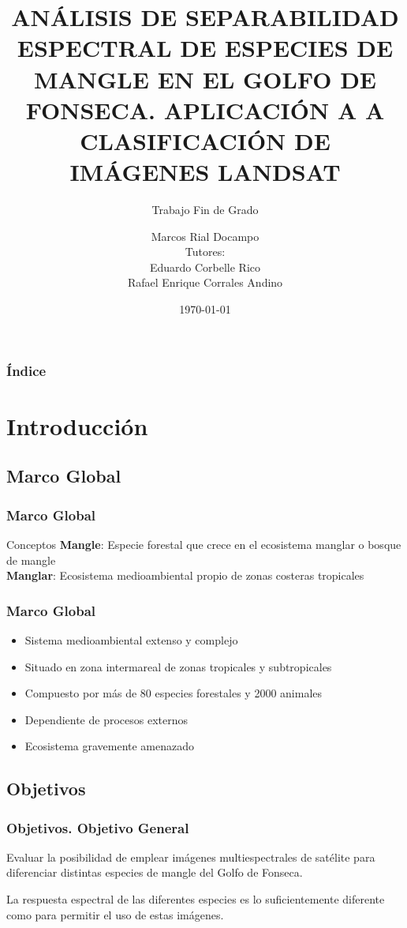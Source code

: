 \documentclass[12pt]{beamer}
\author[Marcos Rial Docampo]{Marcos Rial Docampo\\
\footnotesize{Tutores:\\
Eduardo Corbelle Rico\\
Rafael Enrique Corrales Andino}}
\title[Análisis de Separabilidad Espectral]{ANÁLISIS DE SEPARABILIDAD ESPECTRAL DE ESPECIES DE MANGLE EN EL GOLFO DE FONSECA. APLICACIÓN A A CLASIFICACIÓN DE IMÁGENES LANDSAT}
\subtitle{Trabajo Fin de Grado}
\institute[USC-EPS]{Universidad de Santiago de Compostela\\Escuela Politécnica Superior de Lugo}
\date{\today}
\begin{document}
\begin{frame}
\titlepage
\end{frame}

\begin{frame}
\frametitle{Índice}
\tableofcontents
\end{frame}

\section{Introducción}
\subsection{Marco Global}
\begin{frame}
\frametitle{Marco Global}
\begin{block}{Conceptos}
\textbf{Mangle}: Especie forestal que crece en el ecosistema manglar o bosque de mangle\\
\textbf{Manglar}: Ecosistema medioambiental propio de zonas costeras tropicales
\end{block}
\end{frame}

\begin{frame}
\frametitle{Marco Global}
\begin{itemize}
\item Sistema medioambiental extenso y complejo
\item Situado en zona intermareal de zonas tropicales y subtropicales
\item Compuesto por más de 80 especies forestales y 2000 animales
\item Dependiente de procesos externos
\item Ecosistema gravemente amenazado
\end{itemize}
\end{frame}

\subsection{Objetivos}
\begin{frame}
\frametitle{Objetivos. Objetivo General}
Evaluar la posibilidad de emplear imágenes multiespectrales de satélite para diferenciar distintas especies de mangle del Golfo de Fonseca.

La respuesta espectral de las diferentes especies es lo suficientemente diferente como para permitir el uso de estas imágenes.
\end{frame}
\end{document}
